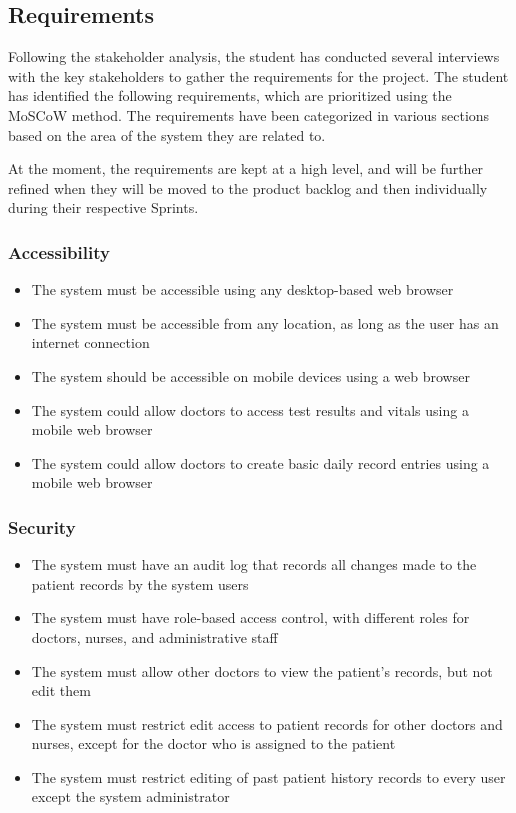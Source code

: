 \subsection{Requirements}

Following the stakeholder analysis, the student has conducted several interviews with the key stakeholders to gather the requirements for the project. The student has identified the following requirements, which are prioritized using the MoSCoW method. The requirements have been categorized in various sections based on the area of the system they are related to. 

At the moment, the requirements are kept at a high level, and will be further refined when they will be moved to the product backlog and then individually during their respective Sprints.

\subsubsection{Accessibility}
\begin{itemize}
    \item The system must be accessible using any desktop-based web browser
    \item The system must be accessible from any location, as long as the user has an internet connection
    \item The system should be accessible on mobile devices using a web browser
    \item The system could allow doctors to access test results and vitals using a mobile web browser
    \item The system could allow doctors to create basic daily record entries using a mobile web browser
\end{itemize}

\subsubsection{Security}
\begin{itemize}
    \item The system must have an audit log that records all changes made to the patient records by the system users
    \item The system must have role-based access control, with different roles for doctors, nurses, and administrative staff
    \item The system must allow other doctors to view the patient's records, but not edit them
    \item The system must restrict edit access to patient records for other doctors and nurses, except for the doctor who is assigned to the patient
    \item The system must restrict editing of past patient history records to every user except the system administrator
\end{itemize}


